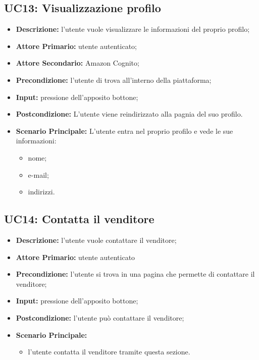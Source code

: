         \subsection{UC13: Visualizzazione profilo}
        \label{sec:UC13}
        \begin{itemize}
            \item \textbf{Descrizione:} l'utente vuole visualizzare le informazioni del proprio profilo;
            \item \textbf{Attore Primario:} utente autenticato;
            \item \textbf{Attore Secondario:} Amazon Cognito;
            \item \textbf{Precondizione:} l'utente di trova all'interno della piattaforma;
            \item \textbf{Input:} pressione dell'apposito bottone;
            \item \textbf{Postcondizione:} L'utente viene reindirizzato alla pagnia del suo profilo.
            \item \textbf{Scenario Principale:} L'utente entra nel proprio profilo e vede le sue informazioni:
            \begin{itemize}
                \item nome;
                \item e-mail;
                \item indirizzi.
            \end{itemize}
        \end{itemize}

        
        \subsection{UC14: Contatta il venditore}
        \label{sec:UC14}
        \begin{itemize}
            \item \textbf{Descrizione:} l'utente vuole contattare il venditore;
            \item \textbf{Attore Primario:} utente autenticato
            \item \textbf{Precondizione:} l'utente si trova in una pagina che permette di contattare il venditore;
            \item \textbf{Input:} pressione dell'apposito bottone;
            \item \textbf{Postcondizione:} l'utente può contattare il venditore;
            \item \textbf{Scenario Principale:}
            \begin{itemize}
                \item l'utente contatta il venditore tramite questa sezione.
            \end{itemize}
        \end{itemize}

